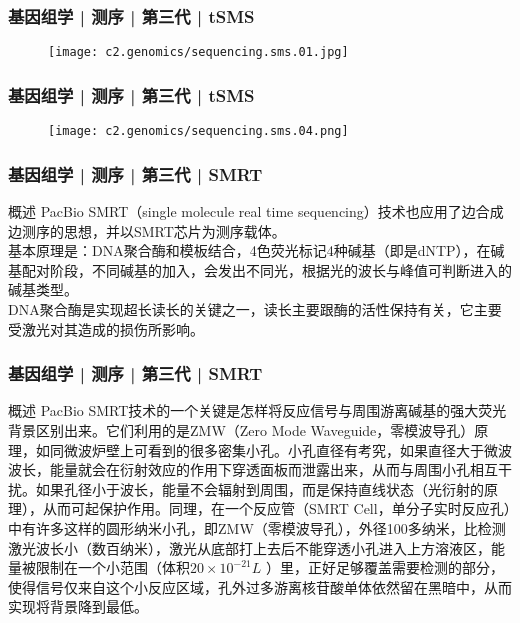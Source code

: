 \begin{frame}
  \frametitle{基因组学 | 测序 | 第三代 | tSMS}
  \begin{figure}
    \centering
    \texttt{[image: c2.genomics/sequencing.sms.01.jpg]}
  \end{figure}
\end{frame}

\begin{frame}
  \frametitle{基因组学 | 测序 | 第三代 | tSMS}
  \begin{figure}
    \centering
    \texttt{[image: c2.genomics/sequencing.sms.04.png]}
  \end{figure}
\end{frame}

\begin{frame}
  \frametitle{基因组学 | 测序 | 第三代 | SMRT}
  \begin{block}{概述}
PacBio SMRT（single molecule real time sequencing）技术也应用了边合成边测序的思想，并以SMRT芯片为测序载体。\\
\vspace{1em}
基本原理是：DNA聚合酶和模板结合，4色荧光标记4种碱基（即是dNTP），在碱基配对阶段，不同碱基的加入，会发出不同光，根据光的波长与峰值可判断进入的碱基类型。\\
\vspace{1em}
DNA聚合酶是实现超长读长的关键之一，读长主要跟酶的活性保持有关，它主要受激光对其造成的损伤所影响。
  \end{block}
\end{frame}

\begin{frame}
  \frametitle{基因组学 | 测序 | 第三代 | SMRT}
  \begin{block}{概述}
    PacBio SMRT技术的一个关键是怎样将反应信号与周围游离碱基的强大荧光背景区别出来。它们利用的是ZMW（Zero Mode Waveguide，零模波导孔）原理，如同微波炉壁上可看到的很多密集小孔。小孔直径有考究，如果直径大于微波波长，能量就会在衍射效应的作用下穿透面板而泄露出来，从而与周围小孔相互干扰。如果孔径小于波长，能量不会辐射到周围，而是保持直线状态（光衍射的原理），从而可起保护作用。同理，在一个反应管（SMRT Cell，单分子实时反应孔）中有许多这样的圆形纳米小孔，即ZMW（零模波导孔），外径100多纳米，比检测激光波长小（数百纳米），激光从底部打上去后不能穿透小孔进入上方溶液区，能量被限制在一个小范围（体积$20 \times 10^{-21}L$ ）里，正好足够覆盖需要检测的部分，使得信号仅来自这个小反应区域，孔外过多游离核苷酸单体依然留在黑暗中，从而实现将背景降到最低。
  \end{block}
\end{frame}

